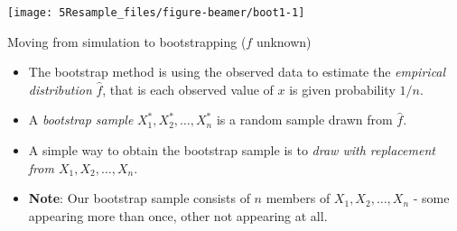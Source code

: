 \documentclass[10pt,ignorenonframetext,]{beamer}
\begin{document}
\begin{frame}

\begin{center}\texttt{[image: 5Resample\_files/figure-beamer/boot1-1]} \end{center}

\end{frame}

\begin{frame}

\begin{block}{Moving from simulation to bootstrapping (\(f\) unknown)}

\vspace{2mm}

\begin{itemize}
\item
  The bootstrap method is using the observed data to estimate the
  \emph{empirical distribution} \(\hat{f}\), that is each observed value
  of \(x\) is given probability \(1/n\).
\item
  A \emph{bootstrap sample} \(X^*_1,X^*_2,\ldots, X^*_n\) is a random
  sample drawn from \(\hat{f}\).
\item
  A simple way to obtain the bootstrap sample is to \emph{draw with
  replacement from \(X_1, X_2, \ldots, X_n\)}.
\item
  \textbf{Note}: Our bootstrap sample consists of \(n\) members of
  \(X_1, X_2, \ldots, X_n\) - some appearing more than once, other not
  appearing at all.
\end{itemize}

\end{block}

\end{frame}
\end{document}
